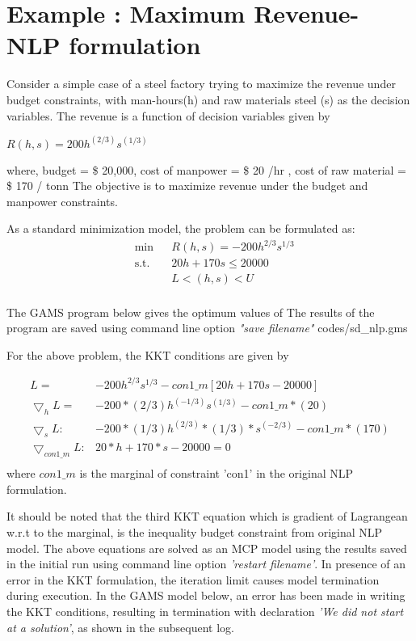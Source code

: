 \documentclass{article}
\begin{document}
\section{Example : Maximum Revenue- NLP formulation}

Consider a simple case of a steel factory trying to maximize the revenue under budget constraints, with man-hours(h) and
raw materials steel (s) as the decision variables. The revenue is a function of decision variables given by

\centerline{$R(h,s) = 200 h^{(2/3)}s^{(1/3)} $ }
\bigbreak
\noindent where, budget = \$ 20,000, cost of manpower = \$ 20 /hr , cost of raw material = \$ 170 / tonn
The objective is to maximize revenue under the budget and manpower constraints.

\noindent As a standard minimization model, the problem can be formulated as:
\begin{equation}
\begin{aligned}
&	\min
& & R(h,s) = - 200 h^{2/3}s^{1/3}  \\
& \text{s.t.} & & 	 20h + 170s \leq 20000 \\
& & &			L< (h,s) < U   \\
\end{aligned}
\end{equation}

The GAMS program below gives the optimum values of 
The results of the program are saved using command line option \textit{"save filename"}
 {codes/sd_nlp.gms}

\noindent For the above problem, the KKT conditions are given by

\begin{equation}
\begin{aligned}
 L = & - 200 h^{2/3}s^{1/3} - con1\_m [ 20h + 170 s - 20000]	\\
 \bigtriangledown_h L = & - 200* (2/3) h^{(-1/3)}  s^{(1/3)} - con1\_m*(20)  	\\
 \bigtriangledown_s L:  & - 200 * (1 / 3) h^{(2/3)} *(1/3) *  s^{(-2/3)} - con1\_m*(170)   \\
 \bigtriangledown_{con1\_m} L : &   20*h + 170 * s - 20000 =0 \\
\end{aligned}
\end{equation}
where $con1\_m$ is the marginal of constraint 'con1' in the original NLP formulation.

\noindent It should be noted that the third KKT equation which is gradient of Lagrangean w.r.t to the marginal, is the inequality budget
constraint from original NLP model. The above equations are solved as an MCP model using the results saved in the initial run using command line
option \textit{'restart filename'}.
In presence of an error in the KKT formulation, the iteration limit causes model termination during execution.
In the GAMS model below, an error has been made in writing the KKT conditions, resulting in termination
with declaration \textit{'We did not start at a solution'}, as shown in the subsequent log.
\end{document}
